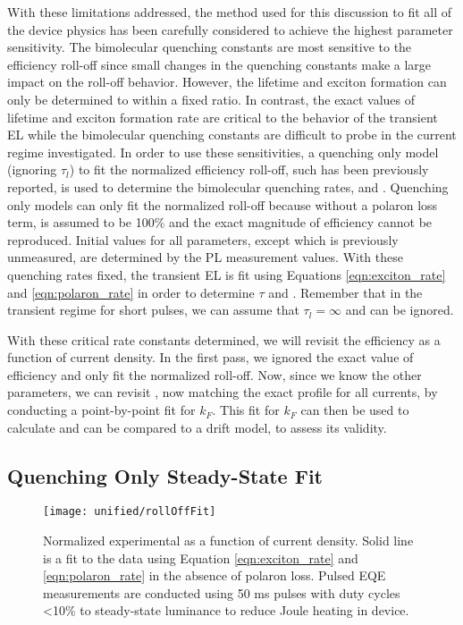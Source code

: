\documentclass[../thesis.tex]{subfiles}
\begin{document}
With these limitations addressed, the method used for this discussion to fit all of the device physics has been carefully considered to achieve the highest parameter sensitivity.
The bimolecular quenching constants are most sensitive to the efficiency roll-off since small changes in the quenching constants make a large impact on the roll-off behavior.
However, the lifetime and exciton formation can only be determined to within a fixed ratio.
In contrast, the exact values of lifetime and exciton formation rate are critical to the behavior of the transient EL while the bimolecular quenching constants are difficult to probe in the current regime investigated.
In order to use these sensitivities, a quenching only model (ignoring $\tau_l$) to fit the normalized efficiency roll-off, such has been previously reported, is used to determine the bimolecular quenching rates, \ktt and \ktp.  
Quenching only models can only fit the normalized \eqe roll-off because without a polaron loss term, \ef is assumed to be 100\% and the exact magnitude of efficiency cannot be reproduced.
Initial values for all parameters, except \kf which is previously unmeasured, are determined by the PL measurement values.
With these quenching rates fixed, the transient EL is fit using Equations \ref{eqn:exciton_rate} and \ref{eqn:polaron_rate} in order to determine $\tau$ and \kf.
Remember that in the transient regime for short pulses, we can assume that $\tau_l=\infty$ and can be ignored.

With these critical rate constants determined, we will revisit the efficiency as a function of current density.
In the first pass, we ignored the exact value of efficiency and only fit the normalized roll-off.
Now, since we know the other parameters, we can revisit \eqe, now matching the exact profile for all currents, by conducting a point-by-point fit for $k_F$.
This fit for $k_F$ can then be used to calculate \ef and can be compared to a drift model, to assess its validity.


\subsection{Quenching Only Steady-State Fit}\label{sec:eqe_fitting}

\begin{wrapfigure}{R}{0.5\textwidth}
\texttt{[image: unified/rollOffFit]}
\caption{Normalized experimental \eqe as a function of current density.  Solid line is a fit to the data using Equation \ref{eqn:exciton_rate} and \ref{eqn:polaron_rate} in the absence of polaron loss.  Pulsed EQE measurements are conducted using 50 ms pulses with duty cycles <10\% to steady-state luminance to reduce Joule heating in device.}
\label{fig:rollOffFit}
\end{wrapfigure}
\end{document}
